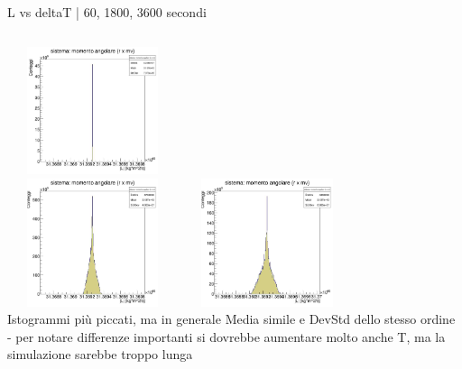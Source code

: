         \begin{frame}{L vs deltaT | 60, 1800, 3600 secondi}
            \begin{columns}
                    \centering        
                    \includegraphics[width=5cm,height=3.75cm]{3_Momento/L_100_60.jpg}\\
                    \includegraphics[width=5cm,height=3.75cm]{3_Momento/L_500_1800.jpg}
                    \label{cfr::LT3}              
                    \centering        
                    \includegraphics[width=5cm,height=3.75cm]{3_Momento/L_500_3600.jpg}\\
                    \label{cfr::LT4}
                    Istogrammi più piccati, ma in generale Media simile e DevStd dello stesso ordine - per notare differenze importanti si dovrebbe aumentare molto anche T, ma la simulazione sarebbe troppo lunga
            \end{columns}            
        \end{frame}
        
